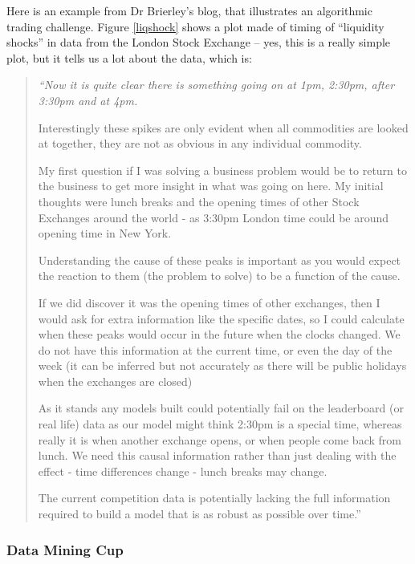 \documentclass{article}
\begin{document}
Here is an example from Dr Brierley's blog, that illustrates an algorithmic trading challenge. Figure \ref{liqshock} shows a plot made of timing of ``liquidity shocks'' in data from the London Stock Exchange -- yes, this is a really simple plot, but it tells us a lot about the data, which is:

\begin{quote}
{\em ``Now it is quite clear there is something going on at 1pm, 2:30pm, after 3:30pm and at 4pm.

Interestingly these spikes are only evident when all commodities are looked at together, they are not as obvious in any individual commodity.

My first question if I was solving a business problem would be to return to the business to get more insight in what was going on here. My initial thoughts were lunch breaks and the opening times of other Stock Exchanges around the world - as 3:30pm London time could be around opening time in New York.

Understanding the cause of these peaks is important as you would expect the reaction to them (the problem to solve) to be a function of the cause.

If we did discover it was the opening times of other exchanges, then I would ask for extra information like the specific dates, so I could calculate when these peaks would occur in the future when the clocks changed. We do not have this information at the current time, or even the day of the week (it can be inferred but not accurately as there will be public holidays when the exchanges are closed)

As it stands any models built could potentially fail on the leaderboard (or real life) data as our model might think 2:30pm is a special time, whereas really it is when another exchange opens, or when people come back from lunch. We need this causal information rather than just dealing with the effect - time differences change - lunch breaks may change.

The current competition data is potentially lacking the full information required to build a model that is as robust as possible over time.'' }
\end{quote}

\subsubsection{Data Mining Cup}
\end{document}
